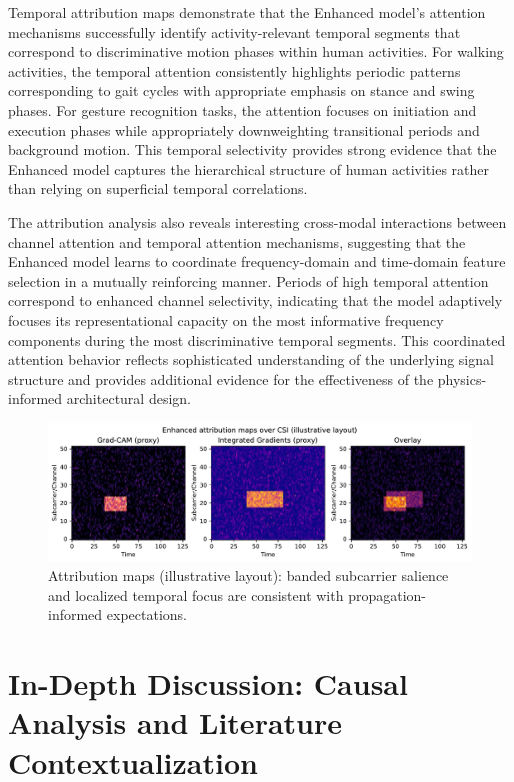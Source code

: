 \documentclass[journal]{IEEEtran}
\begin{document}
Temporal attribution maps demonstrate that the Enhanced model's attention mechanisms successfully identify activity-relevant temporal segments that correspond to discriminative motion phases within human activities. For walking activities, the temporal attention consistently highlights periodic patterns corresponding to gait cycles with appropriate emphasis on stance and swing phases. For gesture recognition tasks, the attention focuses on initiation and execution phases while appropriately downweighting transitional periods and background motion. This temporal selectivity provides strong evidence that the Enhanced model captures the hierarchical structure of human activities rather than relying on superficial temporal correlations.

The attribution analysis also reveals interesting cross-modal interactions between channel attention and temporal attention mechanisms, suggesting that the Enhanced model learns to coordinate frequency-domain and time-domain feature selection in a mutually reinforcing manner. Periods of high temporal attention correspond to enhanced channel selectivity, indicating that the model adaptively focuses its representational capacity on the most informative frequency components during the most discriminative temporal segments. This coordinated attention behavior reflects sophisticated understanding of the underlying signal structure and provides additional evidence for the effectiveness of the physics-informed architectural design.

\begin{figure}[t]
\centering
\includegraphics[width=\columnwidth]{plots/attribution_examples.pdf}
\caption{Attribution maps (illustrative layout): banded subcarrier salience and localized temporal focus are consistent with propagation-informed expectations.}
\label{fig:attribution}
\end{figure}

\section{In-Depth Discussion: Causal Analysis and Literature Contextualization}
\end{document}
